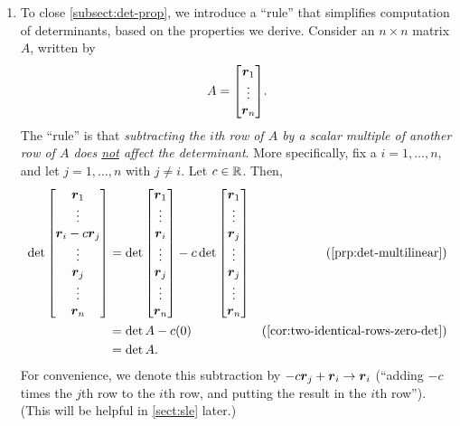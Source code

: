 \begin{enumerate}
\item To close \cref{subsect:det-prop}, we introduce a ``rule'' that simplifies
computation of determinants, based on the properties we derive. Consider an
\(n\times n\) matrix \(A\), written by
\[
A=\mqty[\vect{r}_{1}\\ \vdots\\ \vect{r}_{n}].
\]
The ``rule'' is that \emph{subtracting the \(i\)th row of \(A\) by a scalar
multiple of another row of \(A\) does \underline{not} affect the determinant}.
More specifically, fix a \(i=1,\dotsc,n\), and let \(j=1,\dotsc,n\) with \(j\ne
i\). Let \(c\in\mathbb{R}\). Then,
\begin{align*}
\det\mqty[\vect{r}_{1}\\ \vdots\\ \vect{r}_{i}-c\vect{r}_j\\\vdots\\\vect{r}_{j}\\\vdots\\ \vect{r}_{n}]
&=\det\mqty[\vect{r}_{1}\\ \vdots\\ \vect{r}_{i}\\\vdots\\\vect{r}_{j}\\\vdots\\ \vect{r}_{n}]
-c\det\mqty[\vect{r}_{1}\\ \vdots\\ \vect{r}_{j}\\\vdots\\\vect{r}_{j}\\\vdots\\ \vect{r}_{n}]&\text{(\cref{prp:det-multilinear})}\\
&=\det A-c(0)&\text{(\cref{cor:two-identical-rows-zero-det})}\\
&=\det A.
\end{align*}
For convenience, we denote this subtraction by \(-c\vb*{r}_{j}+\vb*{r}_{i}\to
\vb*{r}_{i}\) (``adding \(-c\) times the \(j\)th row to the \(i\)th row, and
putting the result in the \(i\)th row'').  (This will be helpful in \cref{sect:sle}
later.)


\end{enumerate}

